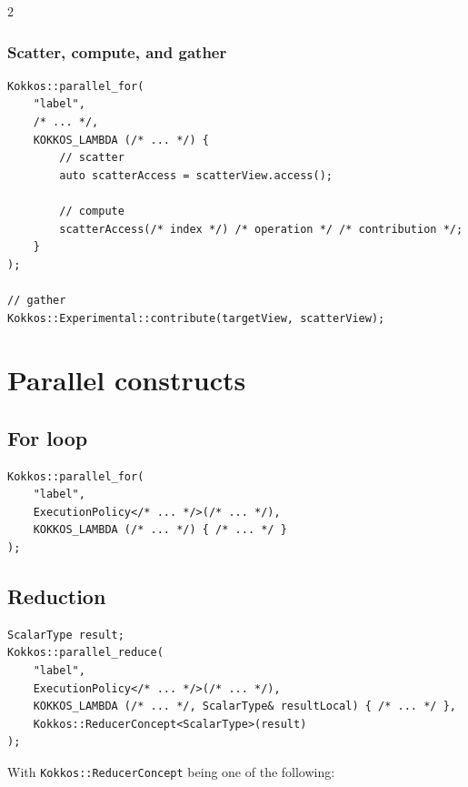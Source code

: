 \documentclass[
    kokkoshighlight,
]{./cheat_sheet_kokkos}
\begin{document}
\begin{multicols}{2}
\subsubsection{Scatter, compute, and gather}

\begin{verbatim}
Kokkos::parallel_for(
    "label",
    /* ... */,
    KOKKOS_LAMBDA (/* ... */) {
        // scatter
        auto scatterAccess = scatterView.access();

        // compute
        scatterAccess(/* index */) /* operation */ /* contribution */;
    }
);

// gather
Kokkos::Experimental::contribute(targetView, scatterView);
\end{verbatim}

\section{Parallel constructs}

\subsection{For loop}

\begin{verbatim}
Kokkos::parallel_for(
    "label",
    ExecutionPolicy</* ... */>(/* ... */),
    KOKKOS_LAMBDA (/* ... */) { /* ... */ }
);
\end{verbatim}

\subsection{Reduction}

\begin{verbatim}
ScalarType result;
Kokkos::parallel_reduce(
    "label",
    ExecutionPolicy</* ... */>(/* ... */),
    KOKKOS_LAMBDA (/* ... */, ScalarType& resultLocal) { /* ... */ },
    Kokkos::ReducerConcept<ScalarType>(result)
);
\end{verbatim}

With \texttt{Kokkos::ReducerConcept} being one of the following:


\end{multicols}
\end{document}
